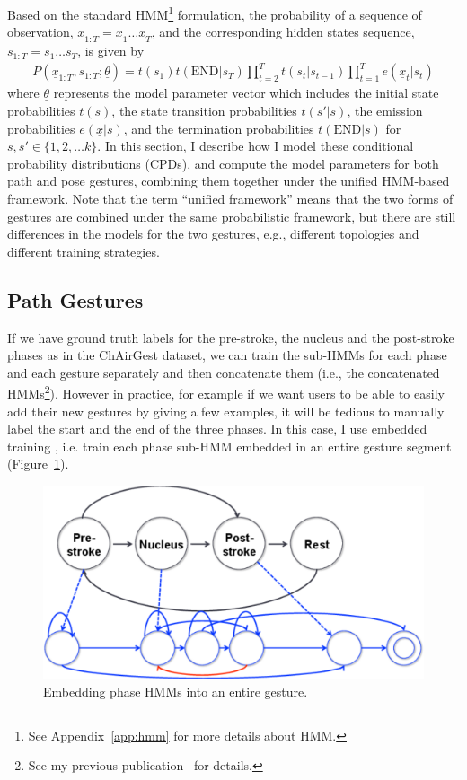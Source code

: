 Based on the standard HMM\footnote{See Appendix~\ref{app:hmm} for more details
about HMM.} formulation, the probability of a sequence of observation, $\underline{x}_{1:T} = \underline{x}_1\ldots\underline{x}_T$, and
the corresponding hidden states sequence, $s_{1:T} = s_1\ldots s_T$, is given by
\begin{align}
P(\underline{x}_{1:T}, s_{1:T};\underline{\theta}) = 
    t(s_1)t(\text{END}|s_T)\prod_{t = 2}^T t(s_t | s_{t-1})\prod_{t = 1}^T
    e(\underline{x}_t|s_t)\label{eq:hmm}
\end{align}
where $\underline{\theta}$ represents the model parameter vector which includes
the initial state probabilities $t(s)$, the state transition probabilities $t(s'|s)$, the 
emission probabilities $e(\underline{x}|s)$,
and the termination probabilities $t(\text{END}|s)$ for $s, s'\in \{1, 2,\ldots
k\}$. In this section, I describe how I model these conditional
probability distributions (CPDs), and compute the model parameters for both
path and pose gestures, combining them together under the unified HMM-based
framework. Note that the term ``unified framework'' means that the two forms of
gestures are combined under the same probabilistic framework, but there are
still differences in the models for the two gestures, e.g., different topologies
and different training strategies.

\subsection{Path Gestures}
If we have ground truth labels for the pre-stroke, the nucleus and the
post-stroke phases as in the ChAirGest dataset, we can train the sub-HMMs for
each phase and each gesture separately and then concatenate them (i.e., the
concatenated HMMs\footnote{See my previous publication~\cite{yin13} for
details.}).
However in practice, for example if we want users to be able to easily add their new gestures by giving a few
examples, it will be tedious to manually label the start and the end of the
three phases. In this case, I use embedded training \cite{young1994}, i.e.
train each phase sub-HMM embedded in an entire gesture segment
(Figure~\ref{fig:embed}).

\begin{figure}[tbh]
\centering
\includegraphics[width=0.7\columnwidth]{figures/embedded.pdf}
\caption{Embedding phase HMMs into an entire gesture.}
\label{fig:embed}
\end{figure}

